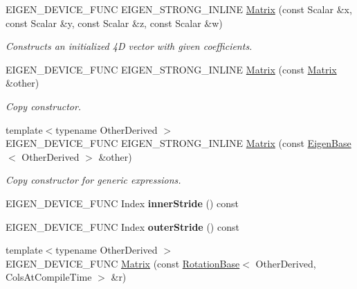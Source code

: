 \begin{DoxyCompactItemize}
E\+I\+G\+E\+N\+\_\+\+D\+E\+V\+I\+C\+E\+\_\+\+F\+U\+NC E\+I\+G\+E\+N\+\_\+\+S\+T\+R\+O\+N\+G\+\_\+\+I\+N\+L\+I\+NE \mbox{\hyperlink{class_eigen_1_1_matrix_afe8c7913883c78db58f15e22103f93a2}{Matrix}} (const Scalar \&x, const Scalar \&y, const Scalar \&z, const Scalar \&w)
\begin{DoxyCompactList}\small\item\em Constructs an initialized 4D vector with given coefficients. \end{DoxyCompactList}\item 
\mbox{\label{class_eigen_1_1_matrix_aea16cba266274974c729c98e8567f41d}} 
E\+I\+G\+E\+N\+\_\+\+D\+E\+V\+I\+C\+E\+\_\+\+F\+U\+NC E\+I\+G\+E\+N\+\_\+\+S\+T\+R\+O\+N\+G\+\_\+\+I\+N\+L\+I\+NE \mbox{\hyperlink{class_eigen_1_1_matrix_aea16cba266274974c729c98e8567f41d}{Matrix}} (const \mbox{\hyperlink{class_eigen_1_1_matrix}{Matrix}} \&other)
\begin{DoxyCompactList}\small\item\em Copy constructor. \end{DoxyCompactList}\item 
{\footnotesize template$<$typename Other\+Derived $>$ }\\E\+I\+G\+E\+N\+\_\+\+D\+E\+V\+I\+C\+E\+\_\+\+F\+U\+NC E\+I\+G\+E\+N\+\_\+\+S\+T\+R\+O\+N\+G\+\_\+\+I\+N\+L\+I\+NE \mbox{\hyperlink{class_eigen_1_1_matrix_ae4bcda7578de9624709cbfa8d3ddd9d9}{Matrix}} (const \mbox{\hyperlink{struct_eigen_1_1_eigen_base}{Eigen\+Base}}$<$ Other\+Derived $>$ \&other)
\begin{DoxyCompactList}\small\item\em Copy constructor for generic expressions. \end{DoxyCompactList}\item 
\mbox{\label{class_eigen_1_1_matrix_a8a9f5452b2060aa8eee77ccd2116d602}} 
E\+I\+G\+E\+N\+\_\+\+D\+E\+V\+I\+C\+E\+\_\+\+F\+U\+NC Index {\bfseries inner\+Stride} () const
\item 
\mbox{\label{class_eigen_1_1_matrix_a4ef63bbf7e04163bee2556944cee7472}} 
E\+I\+G\+E\+N\+\_\+\+D\+E\+V\+I\+C\+E\+\_\+\+F\+U\+NC Index {\bfseries outer\+Stride} () const
\item 
{\footnotesize template$<$typename Other\+Derived $>$ }\\E\+I\+G\+E\+N\+\_\+\+D\+E\+V\+I\+C\+E\+\_\+\+F\+U\+NC \mbox{\hyperlink{class_eigen_1_1_matrix_ae714ec2f92b13d808c336faf185e5893}{Matrix}} (const \mbox{\hyperlink{class_eigen_1_1_rotation_base}{Rotation\+Base}}$<$ Other\+Derived, Cols\+At\+Compile\+Time $>$ \&r)

\end{DoxyCompactItemize}
